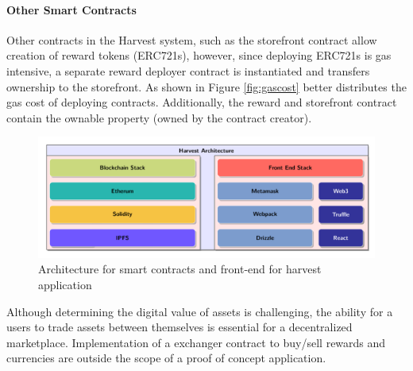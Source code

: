 \documentclass[12pt,tightenlines,letterpaper]{scrartcl}
\begin{document}
\paragraph{Other Smart Contracts}
Other contracts in the Harvest system, such as the storefront contract allow creation of reward tokens (ERC721s), however, since deploying ERC721s is gas intensive, a separate reward deployer contract is instantiated and transfers ownership to the storefront. As shown in Figure \ref*{fig:gascost} better distributes the gas cost of deploying contracts. Additionally, the reward and storefront contract contain the ownable property (owned by the contract creator).

\begin{figure}[H]
\centering
\includegraphics[width=1\linewidth]{Images/harvestArchitectureGood}
\caption{Architecture for smart contracts and front-end for harvest application}
\label{fig:harvestarchitecture}
\end{figure}

 Although determining the digital value of assets is challenging, the ability for a users to trade assets between themselves is essential for a decentralized marketplace. Implementation of a exchanger contract to buy/sell rewards and currencies are outside the scope of a proof of concept application.

\end{document}
